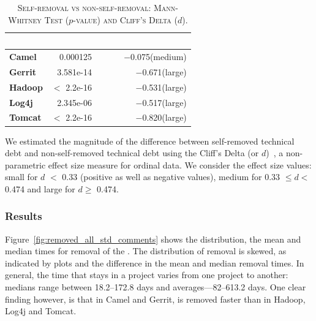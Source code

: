 \begin{table}[t]
	\begin{center}
		\caption{\textsc{Self-removal vs non-self-removal: Mann-Whitney Test ($p$-value) and Cliff's Delta ($d$)}.}
		\label{tbl:statistic}
		\begin{tabular}{l| rrr}
			\toprule
			\textbf{\thead{Project}} & \textbf{\thead{$p$-value}}&~~~ & \textbf{\thead{$d$}}\\ 
			\midrule
			\textbf{Camel }   &  0.000125& ~~~ &  $-$0.075(medium)\\  
			\textbf{Gerrit}   &  3.581e-14& ~~~ &  $-$0.671(large)\\  
			\textbf{Hadoop}   &  $<$ 2.2e-16& ~~~ &  $-$0.531(large)\\  
			\textbf{Log4j}   &  2.345e-06 & ~~~ &  $-$0.517(large)\\  
			\textbf{Tomcat}   &  $<$ 2.2e-16  & ~~~ &  $-$0.820(large)\\  
			\bottomrule
		\end{tabular}
	\end{center} 
	\vspace{-0.1in}   
\end{table}




We estimated the magnitude of the difference between self-removed technical debt and non-self-removed technical debt using the Cliff's Delta (or $d$)~\cite{grissom2005effect}, a non-parametric effect size measure for ordinal data. We consider the effect size values: small for $d$ $<$ 0.33 (positive as well as negative values), medium for 0.33  $\leq d<$ 0.474 and large for $d \geq$ 0.474.

\subsubsection*{Results} Figure~\ref{fig:removed_all_std_comments} shows the distribution, the mean and median times for removal of the \SATD. The distribution of \SATD removal is skewed, as indicated by plots and the difference in the mean and median removal times. In general, the time that \SATD stays in a project  varies from one project to another: medians range between 18.2--172.8 days and averages---82--613.2 days. One clear finding however, is that in Camel and Gerrit, \SATD is removed faster than in Hadoop, Log4j and Tomcat.

